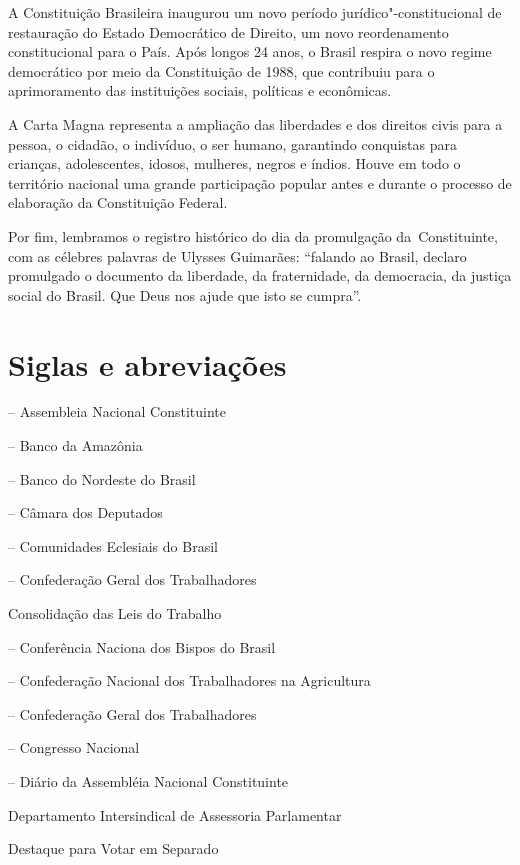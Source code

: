 A Constituição Brasileira inaugurou um novo período
jurídico"-constitucional de restauração do Estado Democrático de Direito,
um novo reordenamento constitucional para o País. Após longos 24 anos, o
Brasil respira o novo regime democrático por meio da Constituição de
1988, que contribuiu para o aprimoramento das instituições sociais,
políticas e econômicas.

A Carta Magna representa a ampliação das liberdades e dos direitos civis
para a pessoa, o cidadão, o indivíduo, o ser humano, garantindo
conquistas para crianças, adolescentes, idosos, mulheres, negros e
índios. Houve em todo o território nacional uma grande participação
popular antes e durante o processo de elaboração da Constituição
Federal.

Por fim, lembramos o registro histórico do dia da promulgação
da~Constituinte, com as célebres palavras de Ulysses Guimarães:
``falando ao Brasil, declaro promulgado o documento da liberdade, da
fraternidade, da democracia, da justiça social do Brasil. Que Deus nos
ajude que isto se cumpra''.

\section{Siglas e abreviações}

 -- Assembleia Nacional Constituinte

 -- Banco da Amazônia

 -- Banco do Nordeste do Brasil

 -- Câmara dos Deputados

 -- Comunidades Eclesiais do Brasil

 -- Confederação Geral dos Trabalhadores

 Consolidação das Leis do Trabalho

 -- Conferência Naciona dos Bispos do Brasil

 -- Confederação Nacional dos Trabalhadores na
Agricultura

 -- Confederação Geral dos Trabalhadores

 -- Congresso Nacional

 -- Diário da Assembléia Nacional Constituinte

 Departamento Intersindical de Assessoria Parlamentar

 Destaque para Votar em Separado

